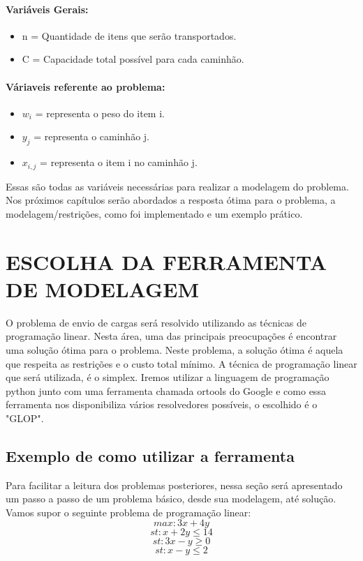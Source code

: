   \paragraph{Variáveis Gerais:}
    \begin{itemize}
      \item n = Quantidade de itens que serão transportados.
      \item C = Capacidade total possível para cada caminhão.
    \end{itemize}

  \paragraph{Váriaveis referente ao problema:}
    \begin{itemize}
      \item {\( w_{i} \) = representa o peso do item i. }
      \item {\( y_{j} \) = representa o caminhão j.}
      \item \( x_{i,j}\) = representa o item i no caminhão j.
    \end{itemize}

  Essas são todas as variáveis necessárias para realizar a modelagem do problema. Nos próximos capítulos serão abordados a resposta ótima para o problema, a modelagem/restrições, como foi implementado e um exemplo prático. 

\section{ESCOLHA DA FERRAMENTA DE MODELAGEM}
  O problema de envio de cargas será resolvido utilizando as técnicas de programação linear. Nesta área, uma das principais preocupações é encontrar uma solução ótima para o problema. Neste problema, a solução ótima é aquela que respeita as restrições e o custo total mínimo. A técnica de programação linear que será utilizada, é o simplex.
  Iremos utilizar a linguagem de programação python junto com uma ferramenta chamada ortools do Google e como essa ferramenta nos disponibiliza vários resolvedores possíveis, o escolhido é o "GLOP".

  \subsection{Exemplo de como utilizar a ferramenta}
    Para facilitar a leitura dos problemas posteriores, nessa seção será apresentado um passo a passo de um problema básico, desde sua modelagem, até solução. Vamos supor o seguinte problema de programação linear:
    \[max: 3x + 4y \]
    \[st: x + 2y \leq 14 \]
    \[st: 3x - y \geq 0 \]
    \[st: x - y \leq 2 \]

